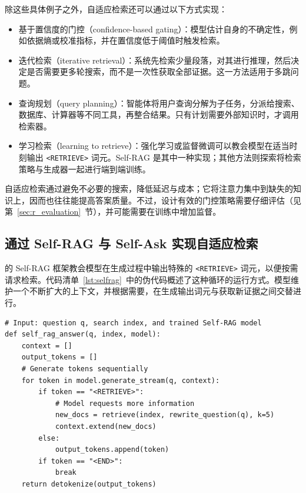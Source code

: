 除这些具体例子之外，自适应检索还可以通过以下方式实现：
\begin{itemize}
\item 基于置信度的门控（confidence-based gating）：模型估计自身的不确定性，例如依据熵或校准指标，并在置信度低于阈值时触发检索。
\item 迭代检索（iterative retrieval）：系统先检索少量段落，对其进行推理，然后决定是否需要更多轮搜索，而不是一次性获取全部证据。这一方法适用于多跳问题。
\item 查询规划（query planning）：智能体将用户查询分解为子任务，分派给搜索、数据库、计算器等不同工具，再整合结果。只有计划需要外部知识时，才调用检索器。
\item 学习检索（learning to retrieve）：强化学习或监督微调可以教会模型在适当时刻输出 \texttt{<RETRIEVE>} 词元。Self-RAG 是其中一种实现；其他方法则探索将检索策略与生成器一起进行端到端训练。
\end{itemize}
自适应检索通过避免不必要的搜索，降低延迟与成本；它将注意力集中到缺失的知识上，因而也往往能提高答案质量。不过，设计有效的门控策略需要仔细评估（见第~\ref{sec:r_evaluation}~节），并可能需要在训练中增加监督。


\subsection{通过 Self-RAG 与 Self-Ask 实现自适应检索}

\citet{asai2023selfrag} 的 Self-RAG 框架教会模型在生成过程中输出特殊的 \texttt{<RETRIEVE>} 词元，以便按需请求检索。代码清单~\ref{lst:selfrag}~中的伪代码概述了这种循环的运行方式。模型维护一个不断扩大的上下文，并根据需要，在生成输出词元与获取新证据之间交替进行。

\begin{listing}[!ht]
\begin{verbatim}
# Input: question q, search index, and trained Self-RAG model
def self_rag_answer(q, index, model):
    context = []
    output_tokens = []
    # Generate tokens sequentially
    for token in model.generate_stream(q, context):
        if token == "<RETRIEVE>":
            # Model requests more information
            new_docs = retrieve(index, rewrite_question(q), k=5)
            context.extend(new_docs)
        else:
            output_tokens.append(token)
        if token == "<END>":
            break
    return detokenize(output_tokens)
\end{verbatim}
\caption{演示 Self-RAG 的高层伪代码}
\label{lst:selfrag}
\end{listing}

